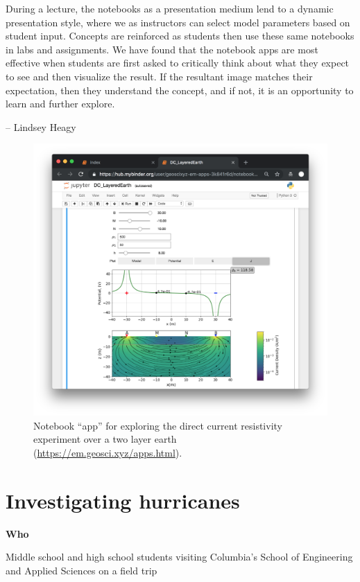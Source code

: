 \documentclass[]{book}
\begin{document}
During a lecture, the notebooks as a presentation medium lend to a
dynamic presentation style, where we as instructors can select model
parameters based on student input. Concepts are reinforced as students
then use these same notebooks in labs and assignments. We have found
that the notebook apps are most effective when students are first asked
to critically think about what they expect to see and then visualize the
result. If the resultant image matches their expectation, then they
understand the concept, and if not, it is an opportunity to learn and
further explore.

-- Lindsey Heagy

\begin{figure}
\centering
\includegraphics{images/DC-layered-earth-app.png}
\caption{Notebook ``app'' for exploring the direct current resistivity
experiment over a two layer earth
(\url{https://em.geosci.xyz/apps.html}).}
\end{figure}

\section{Investigating hurricanes}\label{investigating-hurricanes}

\textbf{Who}

Middle school and high school students visiting Columbia's School of
Engineering and Applied Sciences on a field trip
\end{document}
